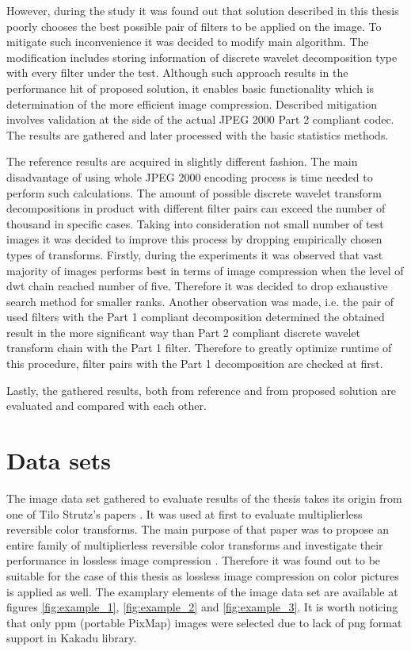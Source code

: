 However, during the study it was found out that solution described in this thesis poorly chooses
the best possible pair of filters to be applied on the image. To mitigate such inconvenience it
was decided to modify main algorithm. The modification includes storing information of discrete
wavelet decomposition type with every filter under the test. Although such approach results in
the performance hit of proposed solution, it enables basic functionality which is determination
of the more efficient image compression. Described mitigation involves validation at the side of
the actual JPEG 2000 Part 2 compliant codec. The results are gathered and later processed with
the basic statistics methods.

The reference results are acquired in slightly different fashion. The main disadvantage of using
whole JPEG 2000 encoding process is time needed to perform such calculations. The amount of possible
discrete wavelet transform decompositions in product with different filter pairs can exceed the
number of thousand in specific cases. Taking into consideration not small number of test images
it was decided to improve this process by dropping empirically chosen types of transforms. Firstly,
during the experiments it was observed that vast majority of images performs best in terms of
image compression when the level of dwt chain reached number of five. Therefore it was decided to
drop exhaustive search method for smaller ranks. Another observation was made, i.e. the pair of used
filters with the Part 1 compliant decomposition determined the obtained result in the more significant
way than Part 2 compliant discrete wavelet transform chain with the Part 1 filter. Therefore
to greatly optimize runtime of this procedure, filter pairs with the Part 1 decomposition are
checked at first.

Lastly, the gathered results, both from reference and from proposed solution are evaluated and
compared with each other. 

\section{Data sets}

The image data set gathered to evaluate results of the thesis takes its origin from one of
Tilo Strutz's papers \cite{ref_images}. It was used at first to evaluate multiplierless reversible
color transforms. The main purpose of that paper was to propose an entire family of multiplierless
reversible color transforms and investigate their performance in lossless image compression \cite{multiplierless_rct}.
Therefore it was found out to be suitable for the case of this thesis as lossless image compression
on color pictures is applied as well. The examplary elements of the image data set are available at
figures \ref{fig:example_1}, \ref{fig:example_2} and \ref{fig:example_3}. It is worth noticing that only ppm
(portable PixMap) images were selected due to lack of png format support in Kakadu library.

